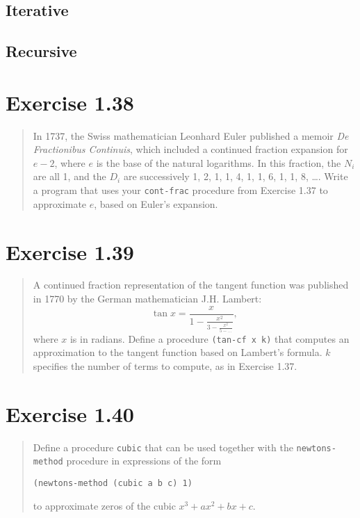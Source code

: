 \documentclass{article}
\begin{document}
\subsection{Iterative}


\subsection{Recursive}


\section{Exercise 1.38}
\begin{quote}
    In 1737, the Swiss mathematician Leonhard Euler published a memoir
    \textit{De Fractionibus Continuis}, which included a continued fraction
    expansion for $e−2$, where $e$ is the base of the natural logarithms. In
    this fraction, the $N_i$ are all 1, and the $D_i$ are successively 1, 2, 1,
    1, 4, 1, 1, 6, 1, 1, 8, \ldots. Write a program that uses your
    \texttt{cont-frac} procedure from Exercise 1.37 to approximate $e$, based
    on Euler’s expansion.
\end{quote}



\section{Exercise 1.39}
\begin{quote}
    A continued fraction representation of the tangent function was published
    in 1770 by the German mathematician J.H. Lambert:
    \begin{equation*}
        \tan{x}= \frac{x}{1-\frac{x^2}{3-\frac{x^2}{5-\ldots}}},
    \end{equation*}
    where $x$ is in radians. Define a procedure \texttt{(tan-cf x k)} that
    computes an approximation to the tangent function based on Lambert’s
    formula. $k$ specifies the number of terms to compute, as in Exercise 1.37.
\end{quote}



\section{Exercise 1.40}
\begin{quote}
    Define a procedure \texttt{cubic} that can be used together with the
    \texttt{newtons-method} procedure in expressions of the form
    \begin{lstlisting}
(newtons-method (cubic a b c) 1)
    \end{lstlisting}
    to approximate zeros of the cubic $x^3+ax^2+bx+c$.
\end{quote}
\end{document}
